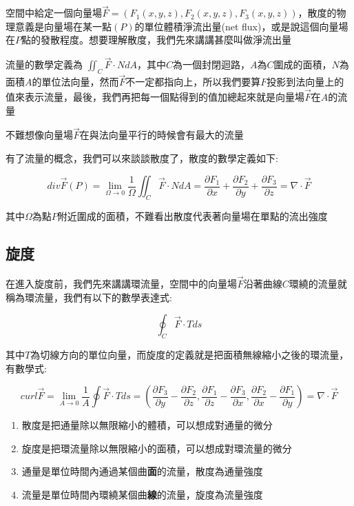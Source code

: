 \documentclass[
]{book}
\providecommand{\tightlist}{%
  \setlength{\itemsep}{0pt}\setlength{\parskip}{0pt}}
\begin{document}
空間中給定一個向量場\(\vec F = (F_1(x,y,z),F_2(x,y,z),F_3(x,y,z))\)，散度的物理意義是向量場在某一點\((P)\)的單位體積淨流出量(net flux)，或是說這個向量場在\(P\)點的發散程度。想要理解散度，我們先來講講甚麼叫做淨流出量

流量的數學定義為 \(\iint_C\vec F \cdot NdA\)，其中\(C\)為一個封閉迴路，\(A\)為\(C\)圍成的面積，\(N\)為面積\(A\)的單位法向量，然而\(\vec F\)不一定都指向上，所以我們要算\(F\)投影到法向量上的值來表示流量，最後，我們再把每一個點得到的值加總起來就是向量場\(\vec F\)在\(A\)的流量

不難想像向量場\(\vec F\)在與法向量平行的時候會有最大的流量

有了流量的概念，我們可以來談談散度了，散度的數學定義如下:

\[div\vec F(P) = \lim_{\Omega \to 0}\frac{1}{\Omega}\iint_C\vec F\cdot NdA = \frac{\partial F_1}{\partial x} + \frac{\partial F_2}{\partial y} + \frac{\partial F_3}{\partial z} = \nabla \cdot \vec F\]

其中\(\Omega\)為點\(P\)附近圍成的面積，不難看出散度代表著向量場在單點的流出強度

\hypertarget{ux65cbux5ea6}{%
\subsection{旋度}\label{ux65cbux5ea6}}

在進入旋度前，我們先來講講環流量，空間中的向量場\(\vec F\)沿著曲線\(C\)環繞的流量就稱為環流量，我們有以下的數學表達式:

\[\oint_C\vec F\cdot Tds\]

其中\(T\)為切線方向的單位向量，而旋度的定義就是把面積無線縮小之後的環流量，有數學式:

\[curl\vec F = \lim_{A \to 0}\frac{1}{A}\oint\vec F \cdot Tds = (\frac{\partial F_3}{\partial y} - \frac{\partial F_2}{\partial z},\frac{\partial F_1}{\partial z} - \frac{\partial F_3}{\partial x}, \frac{\partial F_2}{\partial x} - \frac{\partial F_1}{\partial y}) = \nabla \cdot \vec F\]

\begin{enumerate}
\def\labelenumi{\arabic{enumi}.}
\tightlist
\item
  散度是把通量除以無限縮小的體積，可以想成對通量的微分
\item
  旋度是把環流量除以無限縮小的面積，可以想成對環流量的微分
\item
  通量是單位時間內通過某個曲\textbf{面}的流量，散度為通量強度
\item
  流量是單位時間內環繞某個曲\textbf{線}的流量，旋度為流量強度
\end{enumerate}
\end{document}
